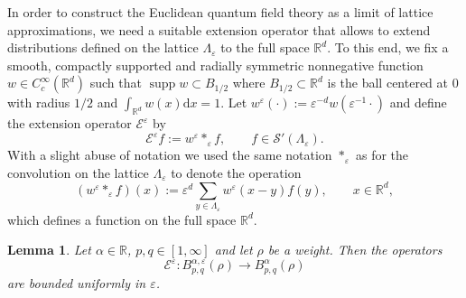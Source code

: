 \documentclass[a4paper,11pt]{article}
\newcommand{\assign}{:=}
\newcommand{\cdummy}{\cdot}
\newcommand{\mathd}{\mathrm{d}}
\newcommand{\tmop}[1]{\ensuremath{\operatorname{#1}}}
\newtheorem{lemma}[theorem]{Lemma}
\numberwithin{equation}{section}
\begin{document}
\label{s:ext}In order to construct the Euclidean quantum field theory as a
limit of lattice approximations, we  need a suitable extension operator
that allows to extend distributions defined on the lattice
$\Lambda_{\varepsilon}$ to the full space $\mathbb{R}^d$.
To this end, we fix a smooth, compactly supported and radially symmetric
nonnegative function $w \in C^{\infty}_c (\mathbb{R}^d)$ such that
$\tmop{supp} w \subset B_{1 / 2}$ where $B_{1 / 2} \subset \mathbb{R}^d$ is
the ball centered at $0$ with radius $1 / 2$ and $\int_{\mathbb{R}^d} w (x)
\mathd x = 1$. Let $w^{\varepsilon} (\cdummy) \assign \varepsilon^{- d} w
(\varepsilon^{- 1} \cdummy)$ and define the extension operator
$\mathcal{E}^{\varepsilon}$ by
\[ \mathcal{E}^{\varepsilon} f  \assign w^{\varepsilon} \ast_{\varepsilon} f,
   \qquad f \in \mathcal{S}' (\Lambda_{\varepsilon}). \]
With a slight abuse of notation we used the same notation  $\ast_{\varepsilon}$ as for the convolution on the lattice
$\Lambda_{\varepsilon}$ to denote the operation
$$
(w^{\varepsilon} \ast_{\varepsilon} f) (x):=\varepsilon^{d}\sum_{y\in\Lambda_{\varepsilon}}w^{\varepsilon}(x-y)f(y),\qquad x\in \mathbb{R}^{d},
$$
which defines a function on the full space $\mathbb{R}^{d}$.

\begin{lemma}
  \label{lem:ext}Let $\alpha \in \mathbb{R}$, $p, q \in [1, \infty]$ and let
  $\rho$ be a weight. Then the operators
  \[ \mathcal{E}^{\varepsilon} : B^{\alpha, \varepsilon}_{p, q} (\rho)
     \rightarrow B^{\alpha}_{p, q} (\rho) \]
  are bounded uniformly in $\varepsilon$.
\end{lemma}
\end{document}
